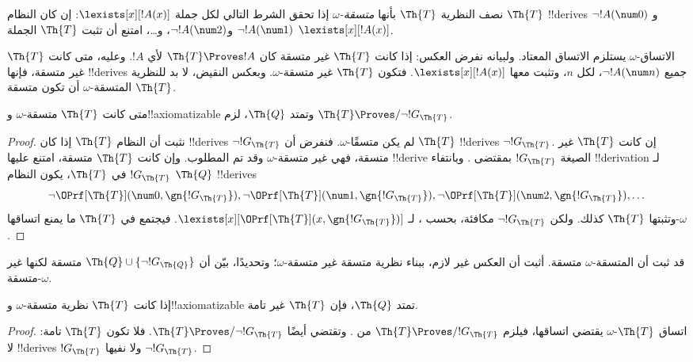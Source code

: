 \documentclass[../../../include/open-logic-section]{subfiles}
\begin{document}
\begin{defn}
نصف النظرية $\Th{T}$ بأنها \emph{متسقة-$\omega$} إذا تحقق الشرط
التالي لكل جملة $\lexists[x][!A(x)]$: إن كان النظام $\Th{T}$
!!{derive}s $\lnot !A(\num 0)$ و$\lnot !A(\num 1)$ و$\lnot !A(\num 2)$،
و\dots، امتنع أن تثبت $\Th{T}$ الجملة $\lexists[x][!A(x)]$.
\end{defn}

الاتساق-$\omega$ يستلزم الاتساق المعتاد. ولبيانه نفرض العكس:
إذا كانت $\Th{T}$ غير متسقة كان $\Th{T}\Proves !A$ لأي $!A$.
وعليه، متى كانت $\Th{T}$ غير متسقة، فإنها !!{derive}s جميع
$\lnot !A(\num n)$، لكل $n$، وتثبت معها
$\lexists[x][!A(x)]$. فتكون $\Th{T}$ غير متسقة-$\omega$.
وبعكس النقيض، لا بد للنظرية $\Th{T}$ المتسقة-$\omega$ أن تكون
متسقة.

\begin{lem}
متى كانت $\Th{T}$ متسقة-$\omega$ و!!{axiomatizable} وتمتد
$\Th{Q}$، لزم $\Th{T}\Proves/\lnot !G_\Th{T}$.
\end{lem}

\begin{proof}
نثبت أن النظام $\Th{T}$ إذا كان !!{derive}s $\lnot !G_\Th{T}$
لم يكن متسقًا-$\omega$. فنفرض أن $\Th{T}$ !!{derive}s
$\lnot !G_\Th{T}$. إن كانت $\Th{T}$ غير متسقة، فهي غير
متسقة-$\omega$ وقد تم المطلوب. وإن كانت $\Th{T}$ متسقة، امتنع
عليها !!{derive} الصيغة $!G_\Th{T}$ بمقتضى
. وبانتفاء !!{derivation} لـ$!G_\Th{T}$
في $\Th{T}$، يكون النظام $\Th{Q}$ !!{derive}s
\[
\lnot \OPrf[\Th{T}](\num 0, \gn{!G_\Th{T}}), \lnot \OPrf[\Th{T}](\num 1,
\gn{!G_\Th{T}}), \lnot \OPrf[\Th{T}](\num 2, \gn{!G_\Th{T}}), \dots
\]
وتثبتها $\Th{T}$ كذلك. ولكن $\lnot !G_\Th{T}$ مكافئة،
بحسب ، لـ
$\lexists[x][\OPrf[\Th{T}](x,\gn{!G_\Th{T}})]$.
فيجتمع في $\Th{T}$ ما يمنع اتساقها-$\omega$.
\end{proof}

\begin{prob}
  قد ثبت أن المتسقة-$\omega$ متسقة. أثبت أن العكس غير لازم،
  ببناء نظرية متسقة غير متسقة-$\omega$؛ وتحديدًا، بيّن أن
  $\Th{Q}\cup\{\lnot !G_\Th{Q}\}$ متسقة لكنها غير متسقة-$\omega$.
\end{prob}

\begin{thm}
 إذا كانت $\Th{T}$ نظرية
متسقة-$\omega$ و!!{axiomatizable} تمتد $\Th{Q}$،
فإن $\Th{T}$ غير تامة.
\end{thm}

\begin{proof}
  اتساق $\Th{T}$-$\omega$ يقتضي اتساقها، فيلزم
  $\Th{T}\Proves/ !G_\Th{T}$ من .
  وتقتضي  أيضًا
  $\Th{T}\Proves/\lnot !G_\Th{T}$. فلا تكون $\Th{T}$ تامة:
  لا !!{derive}s $!G_\Th{T}$ ولا نفيها $\lnot !G_\Th{T}$.
\end{proof}
\end{document}
